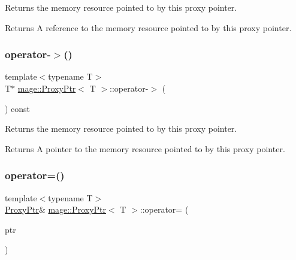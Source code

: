 Returns the memory resource pointed to by this proxy pointer.

\begin{DoxyReturn}{Returns}
A reference to the memory resource pointed to by this proxy pointer. 
\end{DoxyReturn}
\mbox{\label{classmage_1_1_proxy_ptr_af33f20a43615df2328d7436ff3145d54}} 
\subsubsection{\texorpdfstring{operator-\/$>$()}{operator->()}}
{\footnotesize\ttfamily template$<$typename T$>$ \\
T$\ast$ \mbox{\hyperlink{classmage_1_1_proxy_ptr}{mage\+::\+Proxy\+Ptr}}$<$ T $>$\+::operator-\/$>$ (\begin{DoxyParamCaption}{ }\end{DoxyParamCaption}) const\hspace{0.3cm}{\ttfamily [noexcept]}}

Returns the memory resource pointed to by this proxy pointer.

\begin{DoxyReturn}{Returns}
A pointer to the memory resource pointed to by this proxy pointer. 
\end{DoxyReturn}
\mbox{\label{classmage_1_1_proxy_ptr_a2d3a3a7595028a72a97a2c2131947a8d}} 
\subsubsection{\texorpdfstring{operator=()}{operator=()}\hspace{0.1cm}{\footnotesize\ttfamily [1/2]}}
{\footnotesize\ttfamily template$<$typename T$>$ \\
\mbox{\hyperlink{classmage_1_1_proxy_ptr}{Proxy\+Ptr}}\& \mbox{\hyperlink{classmage_1_1_proxy_ptr}{mage\+::\+Proxy\+Ptr}}$<$ T $>$\+::operator= (\begin{DoxyParamCaption}\item[{const \mbox{\hyperlink{classmage_1_1_proxy_ptr}{Proxy\+Ptr}}$<$ T $>$ \&}]{ptr }\end{DoxyParamCaption})\hspace{0.3cm}{\ttfamily [noexcept]}}

